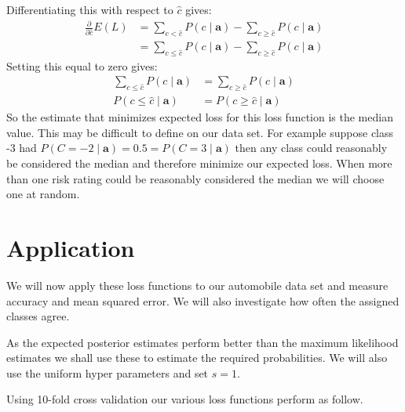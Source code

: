 Differentiating this with respect to $\hat{c}$ gives:
\begin{align}
	\frac{\partial}{\partial \hat{c}} E(L) & = \sum_{c < \hat{c}} P(c \mid \mathbf{a}) - \sum_{c \geq \hat{c}} P(c \mid \mathbf{a}) \\
	& = \sum_{c \leq \hat{c}} P(c \mid \mathbf{a}) - \sum_{c \geq \hat{c}} P(c \mid \mathbf{a})
\end{align}
Setting this equal to zero gives:
\begin{align}
	\sum_{c \leq \hat{c}} P(c \mid \mathbf{a}) & = \sum_{c \geq \hat{c}} P(c \mid \mathbf{a}) \\
	P(c \leq \hat{c} \mid \mathbf{a}) & = P(c \geq \hat{c} \mid \mathbf{a})
\end{align}
So the estimate that minimizes expected loss for this loss function is the median value.
This may be difficult to define on our data set.
For example suppose class -3 had $P(C = -2 \mid \mathbf{a}) = 0.5 = P(C=3 \mid \mathbf{a})$ then any class could reasonably be considered the median and therefore minimize our expected loss.
When more than one risk rating could be reasonably considered the median we will choose one at random.

\section{Application}
We will now apply these loss functions to our automobile data set and measure accuracy and mean squared error.
We will also investigate how often the assigned classes agree.

As the expected posterior estimates perform better than the maximum likelihood estimates we shall use these to estimate the required probabilities.
We will also use the uniform hyper parameters and set $s=1$.

Using 10-fold cross validation our various loss functions perform as follow.

